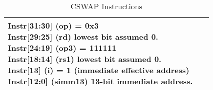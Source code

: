 \documentclass{book}
\begin{document}
\begin{table}[p]
\begin{tabular}[p]{|p{.45\textwidth}|p{.45\textwidth}|}
{    Instr[31:30] (op) = 0x3\\
    Instr[29:25] (rd)    lowest bit assumed 0.\\
    Instr[24:19] (op3) = 111111\\
    Instr[18:14] (rs1)   lowest bit assumed 0.\\
    Instr[13]    (i)  = 1 (immediate effective address)\\
    Instr[12:0]  (simm13) 13-bit immediate address.\\
} & 
 \parbox{\linewidth}{~}\\
\hline
  \end{tabular}
  \caption{CSWAP Instructions}
  \label{tab:cswap:insns}
\end{table}
  
\newpage


\end{document}
